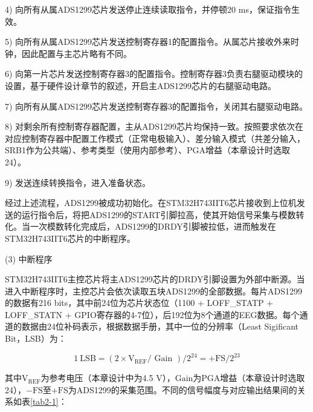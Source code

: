 4) 向所有从属ADS1299芯片发送停止连续读取指令，并停顿20 ms，保证指令生效。

5) 向所有从属ADS1299芯片发送控制寄存器1的配置指令。从属芯片接收外来时钟，因此配置与主芯片略有不同。

6) 向第一片芯片发送控制寄存器3的配置指令。控制寄存器3负责右腿驱动模块的设置，基于硬件设计章节的叙述，开启主ADS1299芯片的右腿驱动电路。

7) 向所有从属ADS1299芯片发送控制寄存器3的配置指令，关闭其右腿驱动电路。

8) 对剩余所有控制寄存器配置，主从ADS1299芯片均保持一致。按照要求依次在对应控制寄存器中配置工作模式（正常电极输入）、差分输入模式（共差分输入，SRB1作为公共端）、参考类型（使用内部参考）、PGA增益（本章设计时选取24）。

9) 发送连续转换指令，进入准备状态。

经过上述流程，ADS1299被成功初始化。在STM32H743IIT6芯片接收到上位机发送的运行指令后，将把ADS1299的START引脚拉高，使其开始信号采集与模数转化。当一次模数转化完成后，ADS1299的DRDY引脚被拉低，进而触发在STM32H743IIT6芯片的中断程序。

(3) 中断程序

STM32H743IIT6主控芯片将主ADS1299芯片的DRDY引脚设置为外部中断源。当进入中断程序时，主控芯片会依次读取五块ADS1299的全部数据。每片ADS1299的数据有216 bits，其中前24位为芯片状态位（1100 + LOFF\_STATP + LOFF\_STATN + GPIO寄存器的4-7位），后192位为8个通道的EEG数据。每个通道的数据由24位补码表示，根据数据手册，其中一位的分辨率（Least Sigificant Bit，LSB）为：

\begin{equation}
    \label{deqn_ex2_3}
    1\ \mathrm{LSB}=\left(2 \times \mathrm{V}_{\mathrm{REF}} / \text { Gain }\right) / 2^{24}=+\mathrm{FS} / 2^{23}
\end{equation}

其中$\mathrm{V}_{\mathrm{REF}}$为参考电压（本章设计中为4.5 V），$\text{Gain}$为PGA增益（本章设计时选取24），$-\mathrm{FS}$至$+\mathrm{FS}$为ADS1299的采集范围。不同的信号幅度与对应输出结果间的关系如表\ref{tab2-1}：

\begin{table*}[!h]
\caption{输入信号幅度与转换结果对应关系}  \label{tab2-1}
\centering
{}
\end{table*}

